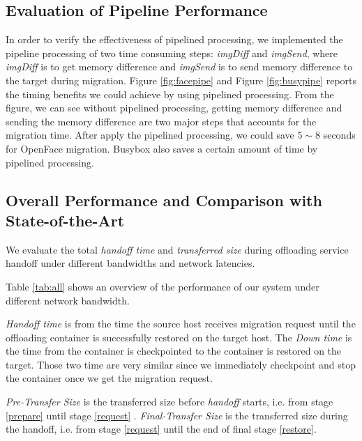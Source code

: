 \subsection{Evaluation of Pipeline Performance}


In order to verify the effectiveness of pipelined processing, we implemented the pipeline processing of two time consuming steps: \textit{imgDiff} and \textit{imgSend}, where \textit{imgDiff} is to get memory difference and \textit{imgSend} is to send memory difference to the target during migration. 
Figure \ref{fig:facepipe} and Figure \ref{fig:busypipe} reports the timing benefits we could achieve by using pipelined processing. From the figure, we can see without pipelined processing, getting memory difference and sending the memory difference are two major steps that accounts for the migration time. After apply the pipelined processing, we could save $5\sim 8$ seconds for OpenFace migration. Busybox also saves a certain amount of time by pipelined processing.


\subsection{Overall Performance and Comparison with State-of-the-Art}
We evaluate the total \textit{handoff time} and \textit{transferred size } during offloading service handoff under different bandwidths and network latencies. 

Table \ref{tab:all} shows an overview of the performance of our system under different network bandwidth.
% 




\textit{Handoff time}
is from the time the source host receives migration request until the offloading container is successfully restored on the target host. The \textit{Down time} is the time from the container is checkpointed to the container is restored on the target. Those two time are very similar since we immediately checkpoint and stop the container once we get the migration request. 

\textit{Pre-Transfer Size} is the transferred size before \textit{handoff} starts, i.e. from stage \ref{prepare} until stage \ref{request} . \textit{Final-Transfer Size} is the transferred size during the handoff, i.e. from stage \ref{request} until the end of final stage \ref{restore}.

